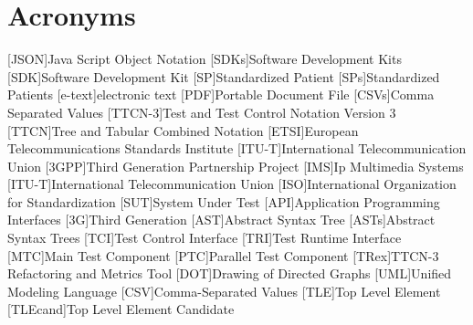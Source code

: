 \section*{Acronyms}
\begin{acronym}
\setlength{\itemsep}{-\parsep} 
[JSON]{Java Script Object Notation}
[SDKs]{Software Development Kits}
[SDK]{Software Development Kit}
[SP]{Standardized Patient}
[SPs]{Standardized Patients}
[e-text]{electronic text}
[PDF]{Portable Document File}
[CSVs]{Comma Separated Values }
[TTCN-3]{Test and Test Control Notation Version 3}
[TTCN]{Tree and Tabular Combined Notation}
[ETSI]{European Telecommunications Standards Institute}
[ITU-T]{International Telecommunication Union}
[3GPP]{Third Generation Partnership Project}
[IMS]{Ip Multimedia Systems}
[ITU-T]{International Telecommunication Union}
[ISO]{International Organization for Standardization}
[SUT]{System Under Test}
[API]{Application Programming Interfaces}
[3G]{Third Generation}
[AST]{Abstract Syntax Tree}
[ASTs]{Abstract Syntax Trees}
[TCI]{Test Control Interface}
[TRI]{Test Runtime Interface}
[MTC]{Main Test Component}
[PTC]{Parallel Test Component}
[TRex]{TTCN-3 Refactoring and Metrics Tool}
[DOT]{Drawing of Directed Graphs}
[UML]{Unified Modeling Language}
[CSV]{Comma-Separated Values}
[TLE]{Top Level Element}
[TLEcand]{Top Level Element Candidate}
\end{acronym}
